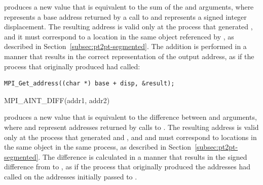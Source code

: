  produces a new  value that is
equivalent to the sum of the  and  arguments, where
 represents a base address returned by a call to
 and  represents a signed integer
displacement. The resulting address is valid only at the process that generated
, and it must correspond to a location in the same object
referenced by , as described in
Section~\ref{subsec:pt2pt-segmented}. The addition is performed in a manner
that results in the correct  representation of the output
address, as if the process that originally produced  had called:
\begin{lstlisting}[language={[MPI]C}]
MPI_Get_address((char *) base + disp, &result);
\end{lstlisting}

%
\begin{funcdef}{MPI\_AINT\_DIFF}{(\mbox{addr1}, \mbox{addr2})}
\end{funcdef}

 produces a new  value that is
equivalent to the difference between  and 
arguments, where  and  represent addresses returned
by calls to .  The resulting address is valid only
at the process that generated  and , and
 and  must correspond to locations in the same
object in the same process, as described in
Section~\ref{subsec:pt2pt-segmented}. The difference is calculated in a manner
that results in
the signed difference from  to , as if
the process that originally produced the addresses had called
on the addresses initially passed to .

